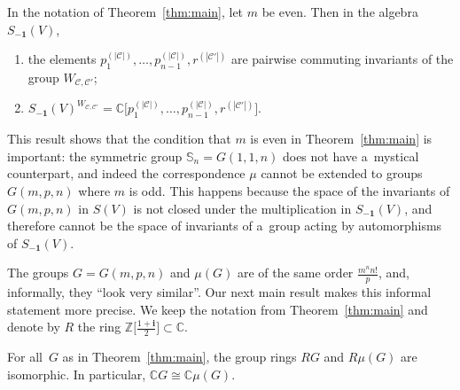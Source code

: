 \begin{Theorem}
In the notation of Theorem~{\rm \ref{thm:main}}, let $m$ be even.
Then in the algebra $S_{\mathbf{-1}}(V)$,
\begin{enumerate}\itemsep=0pt
\item[$(a)$] the elements $p_1^{(|\mathcal C|)},\ldots,p_{n-1}^{(|\mathcal C|)}, r^{(|\mathcal C'|)}$ are pairwise commuting
invariants of the group $W_{\mathcal C,\mathcal C'}$;

\item[$(b)$] $S_{\mathbf{-1}}(V)^{W_{\mathcal C,\mathcal C'}} = \mathbb C\big[p_1^{(|\mathcal C|)},\ldots,p_{n-1}^{(|\mathcal C|)},r^{(|\mathcal C'|)}\big]$.
\end{enumerate}
\end{Theorem}

\begin{Remark}%
This result shows that the condition that $m$ is even in Theorem~\ref{thm:main} is important: the symmetric group
$\mathbb S_n=G(1,1,n)$ does not have a~mystical counterpart, and indeed the correspondence $\mu$ cannot be extended to
groups $G(m,p,n)$ where $m$ is odd.
This happens because the space of the invariants of $G(m,p,n)$ in $S(V)$ is not closed under the multiplication in
$S_{\mathbf{-1}}(V)$, and therefore cannot be the space of invariants of a~group acting by automorphisms of
$S_{\mathbf{-1}}(V)$.
\end{Remark}

The groups $G=G(m,p,n)$ and $\mu(G)$ are of the same order $\frac{m^n n!}{p}$, and, informally, they ``look very similar''.
Our next main result makes this informal statement more precise.
We keep the notation from Theorem~\ref{thm:main} and denote by $R$ the ring $\mathbb
Z\big[\frac{1+\mathbf{i}}{2}\big]\subset\mathbb C$.
\begin{maintheorem}
\label{thm:main2}
For all~$G$ as in Theorem~{\rm \ref{thm:main}}, the group rings $RG$ and $R\mu(G)$ are isomorphic.
In particular, $ \mathbb C G \cong \mathbb C \mu(G) $.
\end{maintheorem}
